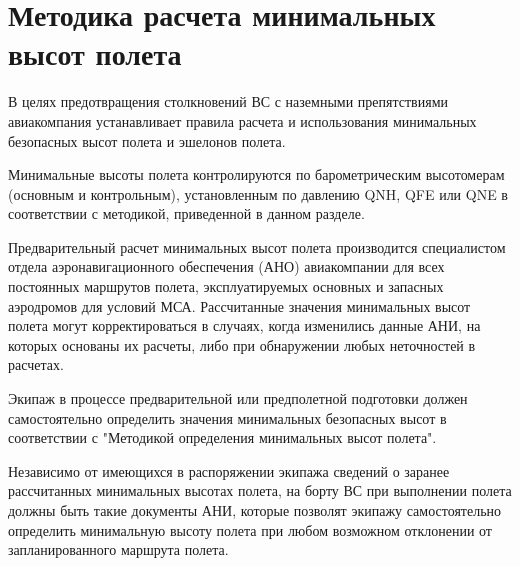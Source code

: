 \section{Методика расчета минимальных высот полета}

В целях предотвращения столкновений ВС с наземными препятствиями авиакомпания устанавливает правила расчета и использования минимальных безопасных высот полета и эшелонов полета.

Минимальные высоты полета контролируются по барометрическим высотомерам (основным и контрольным), установленным по давлению QNH, QFE или QNE в соответствии с методикой, приведенной в данном разделе. 
 
Предварительный расчет минимальных высот полета производится специалистом отдела аэронавигационного обеспечения (АНО) авиакомпании для всех постоянных маршрутов полета, эксплуатируемых основных и запасных аэродромов для условий МСА. Рассчитанные значения минимальных высот полета могут корректироваться в случаях, когда изменились данные АНИ, на которых основаны их расчеты, либо при обнаружении любых неточностей в расчетах.

Экипаж в процессе предварительной или предполетной подготовки должен самостоятельно определить значения минимальных безопасных высот в соответствии с "Методикой определения минимальных высот полета".

Независимо от имеющихся в распоряжении экипажа сведений о заранее рассчитанных минимальных высотах полета, на борту ВС при выполнении полета должны быть такие документы АНИ, которые позволят экипажу самостоятельно определить минимальную высоту полета при любом возможном отклонении от запланированного маршрута полета.

